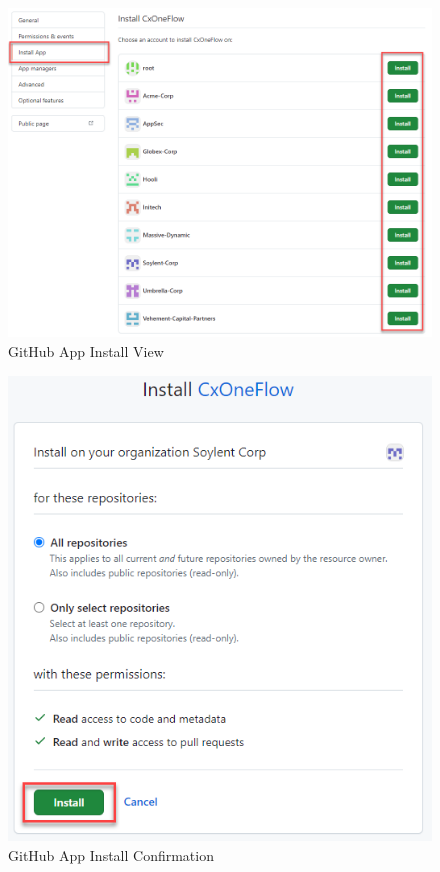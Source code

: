 \begin{figure}[ht]
    \includegraphics[width=\textwidth]{graphics/gh-app-deploy-2.png}
    \caption{GitHub App Install View}
    \label{fig:gh-app-deploy-2}
\end{figure}

\begin{figure}[ht]
    \includegraphics[width=\textwidth]{graphics/gh-app-deploy-3.png}
    \caption{GitHub App Install Confirmation}
    \label{fig:gh-app-deploy-3}
\end{figure}

